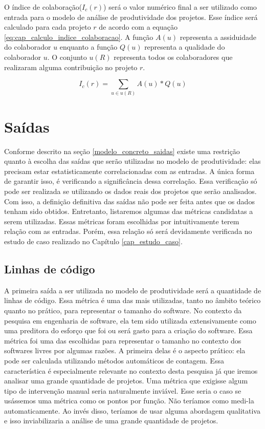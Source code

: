 O índice de colaboração($I_c(r)$) será o valor numérico final a ser utilizado como entrada para o modelo de análise de produtividade dos projetos.  Esse índice será calculado para cada projeto $r$ de acordo com a equação \ref{eq:cap_calculo_indice_colaboracao}. A função $A(u)$ representa a assiduidade do colaborador $u$ enquanto a função $Q(u)$ representa a qualidade do colaborador $u$. O conjunto $u(R)$ representa todos os colaboradores que realizaram alguma contribuição no projeto $r$.


\begin{equation}
\label{eq:cap_calculo_indice_colaboracao}
I_c(r) =  \sum_{u  \in u(R) } A(u) * Q(u)
\end{equation}

\section{Saídas}
\label{secao_modelo_concreto_saidas}

Conforme descrito na seção \ref{modelo_concreto_saidas} existe uma restrição quanto à escolha das saídas que serão utilizadas no modelo de produtividade: elas precisam estar estatisticamente correlacionadas com as entradas. A única forma de garantir isso, é verificando a significância dessa correlação. Essa verificação só pode ser realizada se utilizando os dados reais dos projetos que serão analisados. Com isso, a definição definitiva das saídas não pode ser feita antes que os dados tenham sido obtidos. Entretanto, listaremos algumas das métricas candidatas a serem utilizadas. Essas métricas foram escolhidas por intuitivamente terem relação com as entradas. Porém, essa relação só será devidamente verificada no estudo de caso realizado no Capítulo \ref{cap_estudo_caso}. 

\subsection{Linhas de código}


A primeira saída a ser utilizada no modelo de produtividade será a quantidade de linhas de código. Essa métrica é uma das mais utilizadas, tanto no âmbito teórico quanto no prático, para representar o tamanho do software.  No contexto da pesquisa em engenharia de software, ela tem sido utilizada extensivamente como uma preditora do esforço que foi ou será gasto para a criação do software.  Essa métrica foi uma das escolhidas para representar o tamanho no contexto dos softwares livres por algumas razões. A primeira delas é o aspecto prático: ela pode ser calculada utilizando métodos automáticos de contagem. Essa característica é especialmente relevante no contexto desta pesquisa já que iremos analisar uma grande quantidade de projetos. Uma métrica que exigisse algum tipo de intervenção manual seria naturalmente inviável. Esse seria o caso se usássemos uma métrica como os pontos por função. Não teríamos como medi-la automaticamente. Ao invés disso, teríamos de usar alguma abordagem qualitativa e isso inviabilizaria a análise de uma grande quantidade de projetos. 

